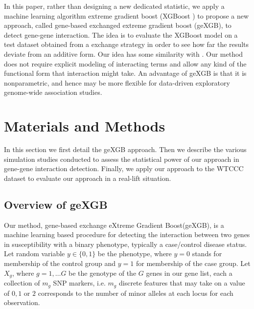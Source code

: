 \documentclass[11pt]{article}
\theoremstyle{plain}
\theoremstyle{definition}
\theoremstyle{remark}
\begin{document}
\noindent In this paper, rather than designing a new dedicated statistic, we apply a machine learning algorithm extreme gradient boost (XGBoost \cite{9}) to propose a new approach, called gene-based exchanged extreme gradient boost (geXGB), to detect gene-gene interaction. The idea is to evaluate the XGBoost model on a test dataset obtained from a exchange strategy in order to see how far the results deviate from an additive form. Our idea has some similarity with \cite{13}. Our method does not require explicit modeling of interacting terms and allow any kind of the functional form that interaction might take. An advantage of geXGB is that it is nonparametric, and hence may be more flexible for data-driven exploratory genome-wide association studies.

\section{Materials and Methods}


In this section we first detail the geXGB approach. Then we describe the various simulation studies conducted to assess the statistical power of our approach in gene-gene interaction detection. Finally, we apply our approach to the WTCCC dataset to evaluate our approach in a real-lift situation.

\subsection{Overview of geXGB}

Our method, gene-based exchange eXtreme Gradient Boost(geXGB), is a machine learning based procedure for detecting the interaction between two genes in susceptibility with a binary phenotype, typically a case/control disease status. Let random variable $y\in\{0,1\}$ be the phenotype, where $y=0$ stands for membership of the control group and $y=1$ for membership of the case group. Let $X_g$, where $g=1,\dots G$ be the genotype of the $G$ genes in our gene list, each a collection of $m_g$ SNP markers, i.e. $m_g$ discrete features that may take on a value of $0,1$ or $2$ corresponds to the number of minor alleles at each locus for each observation. \\
\end{document}
